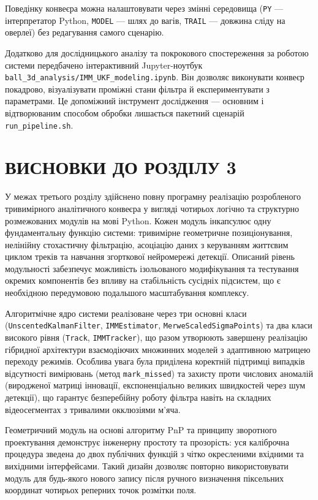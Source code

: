 Поведінку конвеєра можна налаштовувати через змінні середовища (\texttt{PY} ---
інтерпретатор Python, \texttt{MODEL} --- шлях до вагів, \texttt{TRAIL} --- довжина
сліду на оверлеї) без редагування самого сценарію.

Додатково для дослідницького аналізу та покрокового спостереження за роботою
системи передбачено інтерактивний Jupyter-ноутбук
\texttt{ball\_3d\_analysis/IMM\_UKF\_modeling.ipynb}. Він дозволяє виконувати
конвеєр покадрово, візуалізувати проміжні стани фільтра й експериментувати з
параметрами. Це допоміжний інструмент дослідження --- основним і відтворюваним
способом обробки лишається пакетний сценарій \texttt{run\_pipeline.sh}.

\begin{unnumbered}

\section*{ВИСНОВКИ ДО РОЗДІЛУ 3}

У межах третього розділу здійснено повну програмну реалізацію розробленого
тривимірного аналітичного конвеєра у вигляді чотирьох логічно та структурно
розмежованих модулів на мові Python. Кожен модуль інкапсулює одну фундаментальну
функцію системи: тривимірне геометричне позиціонування, нелінійну стохастичну
фільтрацію, асоціацію даних з керуванням життєвим циклом треків та навчання
згорткової нейромережі детекції. Описаний рівень модульності забезпечує можливість
ізольованого модифікування та тестування окремих компонентів без впливу на стабільність
сусідніх підсистем, що є необхідною передумовою подальшого масштабування комплексу.

Алгоритмічне ядро системи реалізоване через три основні класи (\texttt{Unscented\-Kalman\-Filter},
\texttt{IMMEstimator}, \texttt{MerweScaledSigmaPoints}) та два класи високого рівня
(\texttt{Track}, \texttt{IMMTracker}), що разом утворюють завершену реалізацію
гібридної архітектури взаємодіючих множинних моделей з адаптивною матрицею переходу
режимів. Особлива увага була приділена коректній підтримці випадків відсутності
вимірювань (метод \texttt{mark\_missed}) та захисту проти числових аномалій
(виродженої матриці інновації, експоненціально великих швидкостей через шум
детекції), що гарантує безперебійну роботу фільтра навіть на складних відеосегментах
з тривалими окклюзіями м'яча.

Геометричний модуль на основі алгоритму \gls{PnP} та принципу зворотного проектування
демонструє інженерну простоту та прозорість: уся каліброчна процедура зведена до
двох публічних функцій з чітко окресленими вхідними та вихідними інтерфейсами. Такий
дизайн дозволяє повторно використовувати модуль для будь-якого нового запису після
ручного визначення піксельних координат чотирьох реперних точок розмітки поля.


\end{unnumbered}

